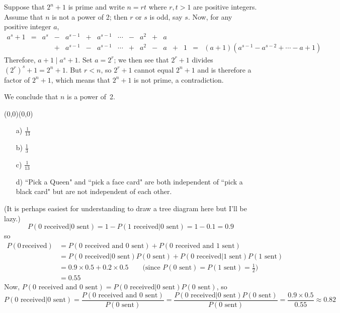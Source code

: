 \documentclass[11pt]{article}
\newcommand{\moveup}{\begin{picture}(0,0)(0,0)\end{picture}\vspace*{-8.15mm}}
\begin{document}
Suppose that $2^n+1$ is prime and write $n = rt$ where $r,t>1$ are positive integers.\\
Assume that $n$ is not a power of 2; then $r$ or $s$ is odd, say $s$.
Now, for any positive integer $a$, 
\[
  \begin{array}{rccrrrrrrrrrrrrrr}
    a^s + 1  &=& a^s&-&a^{s-1}&+&a^{s-1}&\cdots&-&a^2&+&a\\
             & &    &+&a^{s-1}&-&a^{s-1}&\cdots&+&a^2&-&a&+&1
             &=&(a+1)(a^{s-1} - a^{s-2} + \cdots - a + 1)\end{array}
\]
Therefore, $a + 1 \mid a^s + 1$.
Set $a = 2^r$;
we then see that $2^r + 1$ divides $(2^r)^s + 1 = 2^n + 1$.
But $r<n$, so $2^r+1$ cannot equal $2^n+1$ and is therefore a factor of $2^n+1$,
which means that $2^n + 1$ is not prime, a contradiction.

We conclude that $n$ is a power of~2.

\bigskip
{} \moveup
\begin{itemize}
  \item[{a)}] $\frac{1}{13}$
  \item[{b)}] $\frac{1}{3}$
  \item[{c)}] $\frac{1}{13}$
  \item[{d)}] ``Pick a Queen" and ``pick a face card" are both independent of ``pick a black card"
              but are not independent of each other.
\end{itemize}

\bigskip
{}
(It is perhaps easiest for understanding to draw a tree diagram here but I'll be lazy.)
\[
         P(\text{0 received}|\text{0 sent})
   = 1 - P(\text{1 received}|\text{0 sent})
   = 1 - 0.1
   = 0.9
\]
so
\begin{align*}
      P(0\,\text{received})
  &=  P(\text{0 received and 0 sent})
    + P(\text{0 received and 1 sent})\\
  &=  P(\text{0 received}|\text{0 sent})P(\text{0 sent})
    + P(\text{0 received}|\text{1 sent})P(\text{1 sent})\\
  &=  0.9\times 0.5
    + 0.2\times 0.5 \qquad\text{(since $P(\text{0 sent}) = P(\text{1 sent}) = \textstyle\frac{1}{2}$)}\\
  &= 0.55
\end{align*}
Now, $P(\text{0 received and 0 sent}) = P(\text{0 received}|\text{0 sent})P(\text{0 sent})$,
so
\[
    P(\text{0 received}|\text{0 sent})
  = \frac{P(\text{0 received and 0 sent})}{P(\text{0 sent})}
  = \frac{P(\text{0 received}|\text{0 sent})P(\text{0 sent})}{P(\text{0 sent})}
  = \frac{0.9\times 0.5}{0.55}
  \approx 0.82
\]
\end{document}
